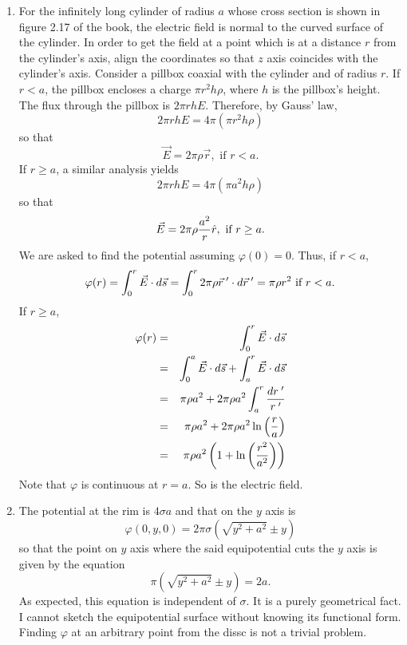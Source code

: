 \documentclass{article}
\begin{document}
\begin{enumerate}
\item For the infinitely long cylinder of radius $a$ whose cross section is shown
in figure 2.17 of the book, the electric field is normal to the curved surface of
the cylinder. In order to get the field at a point which is at a distance $r$ from
the cylinder's axis, align the coordinates so that $z$ axis coincides with the 
cylinder's axis. Consider a pillbox coaxial with the cylinder and of radius $r$.
If $r < a$, the pillbox encloses a charge $\pi r^2 h \rho$, where $h$ is the
pillbox's height. The flux through the pillbox is $2\pi rh E$. Therefore, by
Gauss' law,
\[
2\pi rh E = 4\pi (\pi r^2h \rho)
\]
so that
\begin{equation}\label{e18}
\vec{E} = 2\pi\rho \vec{r}, \text{ if } r < a.
\end{equation}
If $r \ge a$, a similar analysis yields
\[
2\pi rh E = 4\pi (\pi a^2 h \rho)
\]
so that
\begin{equation}\label{e19}
\vec{E} = 2\pi\rho \frac{a^2}{r}\hat{r}, \text{ if } r \ge a.
\end{equation}
We are asked to find the potential assuming $\varphi(0) = 0$. Thus, if $r < a$,
\begin{equation}\label{e20}
\varphi(r) = \int_0^r\vec{E}\cdot d\vec{s} = 
\int_0^r 2\pi\rho \vec{r}^{\;\prime}\cdot d\vec{r}^{\;\prime} = \pi\rho r^2 \text{ if } r < a.
\end{equation}
If $r \ge a$,
\begin{eqnarray}
\varphi(r) &=& \int_0^r\vec{E}\cdot d\vec{s} \nonumber \\
 &=& \int_0^a\vec{E}\cdot d\vec{s} + \int_a^r\vec{E}\cdot d\vec{s} \nonumber \\
 &=& \pi\rho a^2 + 2\pi\rho a^2 \int_a^r \frac{dr^{\;\prime}}{r^{\;\prime}} \nonumber \\
 &=& \pi\rho a^2 + 2\pi\rho a^2\ln\left(\frac{r}{a}\right) \nonumber \\
 &=& \pi\rho a^2\left(1 + \ln\left(\frac{r^2}{a^2}\right)\right) \label{e21}
\end{eqnarray}
Note that $\varphi$ is continuous at $r = a$. So is the electric field.

\item The potential at the rim is $4\sigma a$ and that on the $y$ axis is 
\[
\varphi(0, y, 0) = 2\pi\sigma(\sqrt{y^2 + a^2} \pm y)
\]
so that the point on $y$ axis where the said equipotential cuts the $y$ axis
is given by the equation
\[
\pi(\sqrt{y^2 + a^2} \pm y) = 2 a.
\]
As expected, this equation is independent of $\sigma$. It is a purely geometrical
fact. I cannot sketch the equipotential surface without knowing its functional 
form. Finding $\varphi$ at an arbitrary point from the dissc is not a trivial 
problem.


\end{enumerate}
\end{document}
